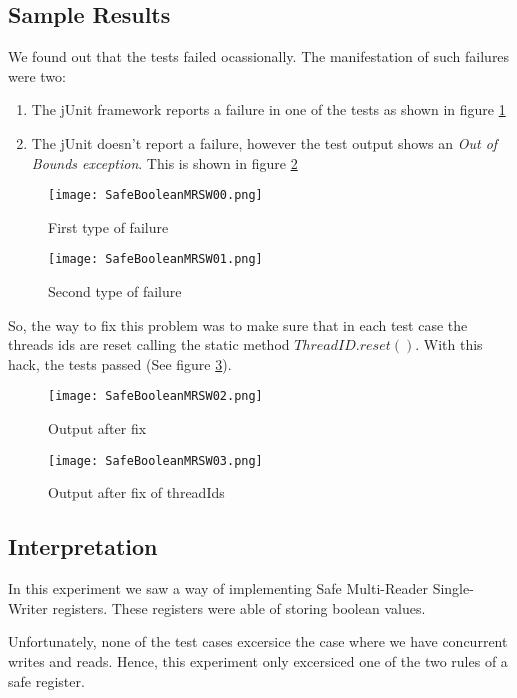 \subsection{Sample Results}
We found out that the tests failed ocassionally. The manifestation of such
failures were two:
\begin{enumerate}
\item The jUnit framework reports a failure in one of the tests as shown in
figure \ref{fig:SafeBooleanMRSW00}
\item The jUnit doesn't report a failure, however the test output shows an
\textit{Out of Bounds exception}. This is shown in figure
\ref{fig:SafeBooleanMRSW01}
\end{enumerate}
\par
\begin{figure}[h]
  \centering
  \texttt{[image: SafeBooleanMRSW00.png]}
  \caption{First type of failure}
  \label{fig:SafeBooleanMRSW00}
\end{figure}
\par
\begin{figure}[h]
  \centering
  \texttt{[image: SafeBooleanMRSW01.png]}
  \caption{Second type of failure}
  \label{fig:SafeBooleanMRSW01}
\end{figure}
\par
So, the way to fix this problem was to make sure that in each test case
the threads ids are reset calling the static method $ThreadID.reset()$. With
this hack, the tests passed (See figure \ref{fig:SafeBooleanMRSW02}).
\par
\begin{figure}[h]
  \centering
  \texttt{[image: SafeBooleanMRSW02.png]}
  \caption{Output after fix}
  \label{fig:SafeBooleanMRSW02}
\end{figure}
\par
\begin{figure}[h]
  \centering
  \texttt{[image: SafeBooleanMRSW03.png]}
  \caption{Output after fix of threadIds}
  \label{fig:SafeBooleanMRSW03}
\end{figure}
\par
\subsection{Interpretation}
\par
In this experiment we saw a way of implementing Safe Multi-Reader Single-Writer
registers. These registers were able of storing boolean values.
\par
Unfortunately, none of the test cases excersice the case where we have
concurrent writes and reads. Hence, this experiment only excersiced one of the
two rules of a safe register.

